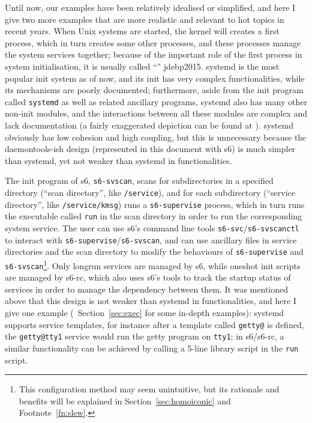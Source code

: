 Until now, our examples have been relatively idealised or simplified, and here
I give two more examples that are more realistic and relevant to hot topics in
recent years.  When Unix systems are started, the kernel will creates a first
process, which in turn creates some other processes, and these processes manage
the system services together; because of the important role of the first process
in system initialisation, it is usually called ``''\cupercite%
{jdebp2015}.  systemd is the most popular init system as of now, and its init
has very complex functionalities, while its mechanisms are poorly documented;
furthermore, aside from the init program called \verb|systemd| as well as
related ancillary programs, systemd also has many other non-init modules, and
the interactions between all these modules are complex and lack documentation
(a fairly exaggerated depiction can be found at \parencite{litt2014b}).
systemd obviously has low cohesion and high coupling, but this is unnecessary
because the daemontools-ish design (represented in this document with s6) is
much simpler than systemd, yet not weaker than systemd in functionalities.

The init program of s6, \verb|s6-svscan|, scans for subdirectories in a
specified directory (``scan directory'', like \verb|/service|), and for each
subdirectory (``service directory'', like \verb|/service/kmsg|) runs a
\verb|s6-supervise| process, which in turn runs the executable called \verb|run|
in the scan directory in order to run the corresponding system service.
The user can use s6's command line tools \verb|s6-svc|/\verb|s6-svscanctl|
to interact with \verb|s6-supervise|/\verb|s6-svscan|, and can use ancillary
files in service directories and the scan directory to modify the behaviours
of \verb|s6-supervise| and \verb|s6-svscan|\footnote{This configuration method
may seem unintuitive, but its rationale and benefits will be explained in
Section~\ref{sec:homoiconic} and Footnote~\ref{fn:slew}.}.  Only longrun
services are managed by s6, while oneshot init scripts are managed by s6-rc,
which also uses s6's tools to track the startup status of services in order
to manage the dependency between them.  It was mentioned above that this
design is not weaker than systemd in functionalities, and here I give one
example (\cf~Section~\ref{sec:exec} for some in-depth examples): systemd
supports service templates, for instance after a template called \verb|getty@|
is defined, the \verb|getty@tty1| service would run the getty program on
\verb|tty1|; in s6/s6-rc, a similar functionality can be achieved by calling
a 5-line library script in the \verb|run| script.

